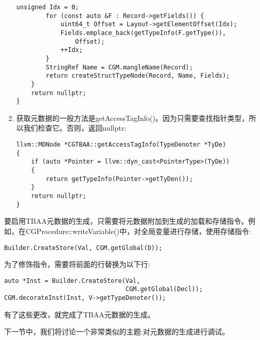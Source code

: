 \begin{enumerate}
\begin{lstlisting}[caption={}]
		unsigned Idx = 0;
		for (const auto &F : Record->getFields()) {
			uint64_t Offset = Layout->getElementOffset(Idx);
			Fields.emplace_back(getTypeInfo(F.getType()), 
				Offset);
			++Idx;
		}
		StringRef Name = CGM.mangleName(Record);
		return createStructTypeNode(Record, Name, Fields);
	}
	return nullptr;
}
\end{lstlisting}

\item 获取元数据的一般方法是getAccessTagInfo()。因为只需要查找指针类型，所以我们检查它。否则，返回nullptr:
\begin{lstlisting}[caption={}]
llvm::MDNode *CGTBAA::getAccessTagInfo(TypeDenoter *TyDe) 
{
	if (auto *Pointer = llvm::dyn_cast<PointerType>(TyDe)) 
	{
		return getTypeInfo(Pointer->getTyDen());
	}
	return nullptr;
}
\end{lstlisting}
\end{enumerate}

要启用TBAA元数据的生成，只需要将元数据附加到生成的加载和存储指令。例如，在CGProcedure::writeVariable()中，对全局变量进行存储，使用存储指令:\par

\begin{lstlisting}[caption={}]
Builder.CreateStore(Val, CGM.getGlobal(D));
\end{lstlisting}

为了修饰指令，需要将前面的行替换为以下行:\par

\begin{lstlisting}[caption={}]
auto *Inst = Builder.CreateStore(Val,
								 CGM.getGlobal(Decl));
CGM.decorateInst(Inst, V->getTypeDenoter());
\end{lstlisting}

有了这些更改，就完成了TBAA元数据的生成。\par

下一节中，我们将讨论一个非常类似的主题:对元数据的生成进行调试。\par








